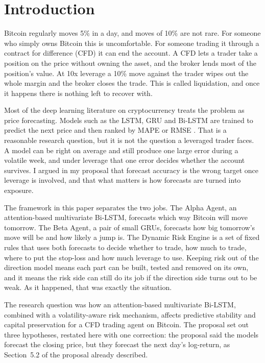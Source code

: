 \section{Introduction}\label{sec:intro}

Bitcoin regularly moves 5\% in a day, and moves of 10\% are not rare. For someone who simply owns Bitcoin this is uncomfortable. For someone trading it through a contract for difference (CFD) it can end the account. A CFD lets a trader take a position on the price without owning the asset, and the broker lends most of the position's value. At 10x leverage a 10\% move against the trader wipes out the whole margin and the broker closes the trade. This is called liquidation, and once it happens there is nothing left to recover with.

Most of the deep learning literature on cryptocurrency treats the problem as price forecasting. Models such as the LSTM, GRU and Bi-LSTM are trained to predict the next price and then ranked by MAPE or RMSE \cite{seabe2023,hansun2022}. That is a reasonable research question, but it is not the question a leveraged trader faces. A model can be right on average and still produce one large error during a volatile week, and under leverage that one error decides whether the account survives. I argued in my proposal that forecast accuracy is the wrong target once leverage is involved, and that what matters is how forecasts are turned into exposure.

The framework in this paper separates the two jobs. The Alpha Agent, an attention-based multivariate Bi-LSTM, forecasts which way Bitcoin will move tomorrow. The Beta Agent, a pair of small GRUs, forecasts how big tomorrow's move will be and how likely a jump is. The Dynamic Risk Engine is a set of fixed rules that uses both forecasts to decide whether to trade, how much to trade, where to put the stop-loss and how much leverage to use. Keeping risk out of the direction model means each part can be built, tested and removed on its own, and it means the risk side can still do its job if the direction side turns out to be weak. As it happened, that was exactly the situation.

The research question was how an attention-based multivariate Bi-LSTM, combined with a volatility-aware risk mechanism, affects predictive stability and capital preservation for a CFD trading agent on Bitcoin. The proposal set out three hypotheses, restated here with one correction: the proposal said the models forecast the closing price, but they forecast the next day's log-return, as Section~5.2 of the proposal already described.

